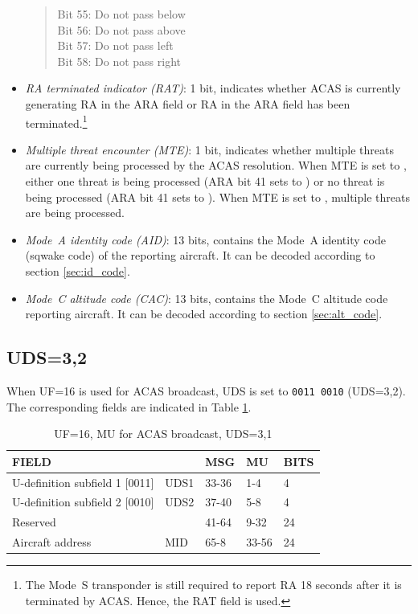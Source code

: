 \begin{itemize}
  \begin{quote}
    \small
    Bit 55: Do not pass below \\
    Bit 56: Do not pass above \\
    Bit 57: Do not pass left \\
    Bit 58: Do not pass right
  \end{quote}


  \item \emph{RA terminated indicator (RAT)}: 1 bit, indicates whether ACAS is currently generating RA in the ARA field or RA in the ARA field has been terminated.\footnote{The Mode~S transponder is still required to report RA 18 seconds after it is terminated by ACAS. Hence, the RAT field is used.}


  \item \emph{Multiple threat encounter (MTE)}: 1 bit, indicates whether multiple threats are currently being processed by the ACAS resolution. When MTE is set to \0, either one threat is being processed (ARA bit 41 sets to \1) or no threat is being processed (ARA bit 41 sets to \0). When MTE is set to \1, multiple threats are being processed.

  \item \emph{Mode~A identity code (AID)}: 13 bits, contains the Mode~A identity code (sqwake code) of the reporting aircraft. It can be decoded according to section \ref{sec:id_code}.

  \item \emph{Mode~C altitude code (CAC)}: 13 bits, contains the Mode~C altitude code reporting aircraft. It can be decoded according to section \ref{sec:alt_code}.


\end{itemize}



\subsection{UDS=3,2}

When UF=16 is used for ACAS broadcast, UDS is set to \texttt{0011 0010} (UDS=3,2). The corresponding fields are indicated in Table \ref{tb:acas_mu_uds32}.

\begin{table}[ht]
\caption{UF=16, MU for ACAS broadcast, UDS=3,1}
\label{tb:acas_mu_uds32}
\begin{tabular}{|l|l|l|l|l|}
\hline
\textbf{FIELD} & \textbf{} & \textbf{MSG} & \textbf{MU} & \textbf{BITS} \\ \hline
U-definition subfield 1 [0011] & UDS1 & 33-36 & 1-4 & 4 \\ \hline
U-definition subfield 2 [0010] & UDS2 & 37-40 & 5-8 & 4 \\ \hline
Reserved &  & 41-64 & 9-32 & 24 \\ \hline
Aircraft address & MID & 65-8 & 33-56 & 24 \\ \hline
\end{tabular}
\end{table}


